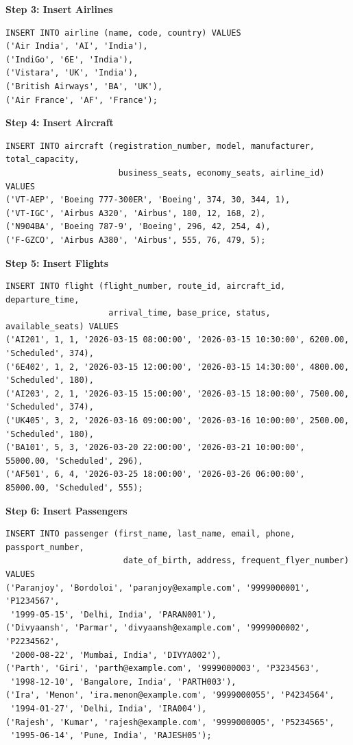 \documentclass[12pt, a4paper]{article}
\begin{document}
\textbf{Step 3: Insert Airlines}
\begin{lstlisting}[style=sqlstyle]
INSERT INTO airline (name, code, country) VALUES
('Air India', 'AI', 'India'),
('IndiGo', '6E', 'India'),
('Vistara', 'UK', 'India'),
('British Airways', 'BA', 'UK'),
('Air France', 'AF', 'France');
\end{lstlisting}

\textbf{Step 4: Insert Aircraft}
\begin{lstlisting}[style=sqlstyle]
INSERT INTO aircraft (registration_number, model, manufacturer, total_capacity, 
                       business_seats, economy_seats, airline_id) VALUES
('VT-AEP', 'Boeing 777-300ER', 'Boeing', 374, 30, 344, 1),
('VT-IGC', 'Airbus A320', 'Airbus', 180, 12, 168, 2),
('N904BA', 'Boeing 787-9', 'Boeing', 296, 42, 254, 4),
('F-GZCO', 'Airbus A380', 'Airbus', 555, 76, 479, 5);
\end{lstlisting}

\textbf{Step 5: Insert Flights}
\begin{lstlisting}[style=sqlstyle]
INSERT INTO flight (flight_number, route_id, aircraft_id, departure_time, 
                     arrival_time, base_price, status, available_seats) VALUES
('AI201', 1, 1, '2026-03-15 08:00:00', '2026-03-15 10:30:00', 6200.00, 'Scheduled', 374),
('6E402', 1, 2, '2026-03-15 12:00:00', '2026-03-15 14:30:00', 4800.00, 'Scheduled', 180),
('AI203', 2, 1, '2026-03-15 15:00:00', '2026-03-15 18:00:00', 7500.00, 'Scheduled', 374),
('UK405', 3, 2, '2026-03-16 09:00:00', '2026-03-16 10:00:00', 2500.00, 'Scheduled', 180),
('BA101', 5, 3, '2026-03-20 22:00:00', '2026-03-21 10:00:00', 55000.00, 'Scheduled', 296),
('AF501', 6, 4, '2026-03-25 18:00:00', '2026-03-26 06:00:00', 85000.00, 'Scheduled', 555);
\end{lstlisting}

\textbf{Step 6: Insert Passengers}
\begin{lstlisting}[style=sqlstyle]
INSERT INTO passenger (first_name, last_name, email, phone, passport_number, 
                        date_of_birth, address, frequent_flyer_number) VALUES
('Paranjoy', 'Bordoloi', 'paranjoy@example.com', '9999000001', 'P1234567', 
 '1999-05-15', 'Delhi, India', 'PARAN001'),
('Divyaansh', 'Parmar', 'divyaansh@example.com', '9999000002', 'P2234562', 
 '2000-08-22', 'Mumbai, India', 'DIVYA002'),
('Parth', 'Giri', 'parth@example.com', '9999000003', 'P3234563', 
 '1998-12-10', 'Bangalore, India', 'PARTH003'),
('Ira', 'Menon', 'ira.menon@example.com', '9999000055', 'P4234564', 
 '1994-01-27', 'Delhi, India', 'IRA004'),
('Rajesh', 'Kumar', 'rajesh@example.com', '9999000005', 'P5234565', 
 '1995-06-14', 'Pune, India', 'RAJESH05');
\end{lstlisting}
\end{document}
